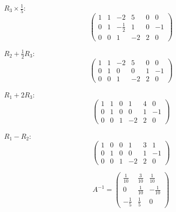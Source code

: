 $R_3 \times \frac{1}{5}$:
\[
	\begin{pmatrix}
		1 & 1 & -2           & 5  & 0 & 0  \\
		0 & 1 & -\frac{1}{2} & 1  & 0 & -1 \\
		0 & 0 & 1            & -2 & 2 & 0
	\end{pmatrix}
\]

$R_2 + \frac{1}{2}R_3$:
\[
	\begin{pmatrix}
		1 & 1 & -2 & 5  & 0 & 0  \\
		0 & 1 & 0 & 0  & 1 & -1 \\
		0 & 0 & 1 & -2 & 2 & 0
	\end{pmatrix}
\]

$R_1 + 2R_3$:
\[
	\begin{pmatrix}
		1 & 1 & 0 & 1  & 4 & 0  \\
		0 & 1 & 0 & 0  & 1 & -1 \\
		0 & 0 & 1 & -2 & 2 & 0
	\end{pmatrix}
\]

$R_1 - R_2$:
\[
	\begin{pmatrix}
		1 & 0 & 0 & 1  & 3 & 1  \\
		0 & 1 & 0 & 0  & 1 & -1 \\
		0 & 0 & 1 & -2 & 2 & 0
	\end{pmatrix}
\]

\[
	A^{-1} = \begin{pmatrix}
		\frac{1}{10} & \frac{3}{10} & \frac{1}{10}  \\
		0            & \frac{1}{10} & -\frac{1}{10} \\
		-\frac{1}{5} & \frac{1}{5}  & 0
	\end{pmatrix}
\]